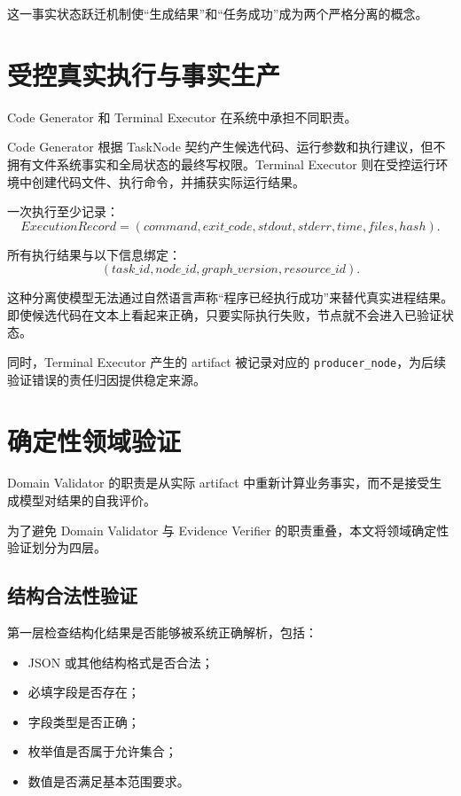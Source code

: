 \documentclass[UTF8,a4paper,12pt,oneside]{ctexbook}
\begin{document}
这一事实状态跃迁机制使“生成结果”和“任务成功”成为两个严格分离的概念。


\section{受控真实执行与事实生产}

Code Generator 和 Terminal Executor 在系统中承担不同职责。

Code Generator 根据 TaskNode 契约产生候选代码、运行参数和执行建议，但不拥有文件系统事实和全局状态的最终写权限。Terminal Executor 则在受控运行环境中创建代码文件、执行命令，并捕获实际运行结果。

一次执行至少记录：
\[
ExecutionRecord=
(command,exit\_code,stdout,stderr,time,files,hash).
\]

所有执行结果与以下信息绑定：
\[
(task\_id,node\_id,graph\_version,resource\_id).
\]

这种分离使模型无法通过自然语言声称“程序已经执行成功”来替代真实进程结果。即使候选代码在文本上看起来正确，只要实际执行失败，节点就不会进入已验证状态。

同时，Terminal Executor 产生的 artifact 被记录对应的 \texttt{producer\_node}，为后续验证错误的责任归因提供稳定来源。


\section{确定性领域验证}

Domain Validator 的职责是从实际 artifact 中重新计算业务事实，而不是接受生成模型对结果的自我评价。

为了避免 Domain Validator 与 Evidence Verifier 的职责重叠，本文将领域确定性验证划分为四层。

\subsection{结构合法性验证}

第一层检查结构化结果是否能够被系统正确解析，包括：

\begin{itemize}
    \item JSON 或其他结构格式是否合法；
    \item 必填字段是否存在；
    \item 字段类型是否正确；
    \item 枚举值是否属于允许集合；
    \item 数值是否满足基本范围要求。
\end{itemize}
\end{document}
